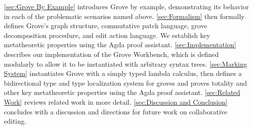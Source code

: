 \autoref{sec:Grove By Example} introduces Grove by example, demonstrating its behavior in each of the problematic scenarios named above. 
\autoref{sec:Formalism} then formally defines Grove's graph structure, commutative patch language, grove decomposition procedure, and edit action language. We establish key metatheoretic properties using the Agda proof assistant. 
\autoref{sec:Implementation} describes our implementation of the Grove Workbench, which is defined modularly to allow it to be instantiated with arbitrary syntax trees. 
\autoref{sec:Marking System} instantiates Grove with a simply typed lambda calculus, then defines a bidirectional type and type localization system for groves and proves totality and other key metatheoretic properties using the Agda proof assistant. 
\autoref{sec:Related Work} reviews related work in more detail. 
\autoref{sec:Discussion and Conclusion} concludes with a discussion and directions for future work on collaborative editing.





